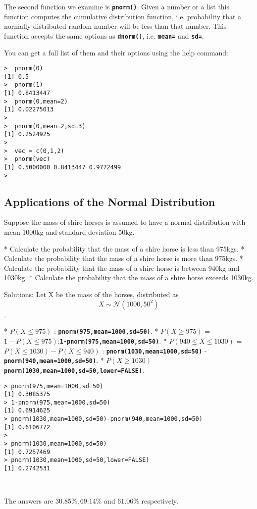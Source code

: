 The second function we examine is \texttt{\textbf{pnorm()}}. Given a number or a list this function computes the cumulative distribution function, i.e. probability that a normally distributed random number will be less than that number. This function accepts the same options as \texttt{\textbf{dnorm()}}, i.e. \texttt{\textbf{mean=}} and \texttt{\textbf{sd=}}.


You can get a full list of them and their options using the help command:

\begin{verbatim}
>  pnorm(0)
[1] 0.5
>  pnorm(1)
[1] 0.8413447
>  pnorm(0,mean=2)
[1] 0.02275013
>
>  pnorm(0,mean=2,sd=3)
[1] 0.2524925
>
>  vec = c(0,1,2)         
>  pnorm(vec)
[1] 0.5000000 0.8413447 0.9772499
>
\end{verbatim}
\subsection{Applications of the Normal Distribution}
Suppose the mass of shire horses is assumed to have a normal distribution with mean 1000kg and standard deviation 50kg. 
\begin{enumerate}
*  Calculate the probability that the mass of a shire horse is less than 975kgs.
*  Calculate the probability that the mass of a shire horse is more than 975kgs.
*  Calculate the probability that the mass of a shire horse is between 940kg and 1030kg.         
*  Calculate the probability that the mass of a shire horse exceeds 1030kg.                
\end{enumerate}

Solutions: Let X be the mass of the horses, distributed as
\[ X \sim \mathcal{N}(1000,50^2)\].
\begin{enumerate}
*  $P(X \leq 975)$ : \texttt{\textbf{pnorm(975,mean=1000,sd=50)}}.
*  $P(X \geq 975)$ =  $ 1- P(X \leq 975)$:\texttt{\textbf{1-pnorm(975,mean=1000,sd=50)}}. 
*  $P(940 \leq X \leq 1030)$ = $P(X \leq 1030) -  P(X \leq 940)$  : \texttt{\textbf{pnorm(1030,mean=1000,sd=50)}} - \texttt{\textbf{pnorm(940,mean=1000,sd=50)}}.     
*  $P(X \geq 1030)$       \texttt{\textbf{pnorm(1030,mean=1000,sd=50,lower=FALSE)}}.
\end{enumerate}
\begin{verbatim}
> pnorm(975,mean=1000,sd=50)
[1] 0.3085375
> 1-pnorm(975,mean=1000,sd=50)
[1] 0.6914625
> pnorm(1030,mean=1000,sd=50)-pnorm(940,mean=1000,sd=50)
[1] 0.6106772
>
> pnorm(1030,mean=1000,sd=50)
[1] 0.7257469
> pnorm(1030,mean=1000,sd=50,lower=FALSE)
[1] 0.2742531



\end{verbatim}
The answers are $30.85\%,69.14\%$ and $61.06\%$ respectively.


